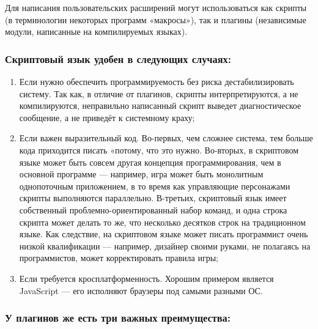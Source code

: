 

Для написания пользовательских расширений могут использоваться как скрипты (в терминологии некоторых программ «макросы»), так и плагины (независимые модули, написанные на компилируемых языках).

\subsubsection{Скриптовый язык удобен в следующих случаях:}

\begin{enumerate}
\item Если нужно обеспечить программируемость без риска дестабилизировать систему. Так как, в отличие от плагинов, скрипты интерпретируются, а не компилируются, неправильно написанный скрипт выведет диагностическое сообщение, а не приведёт к системному краху;
\item Если важен выразительный код. Во-первых, чем сложнее система, тем больше кода приходится писать «потому, что это нужно. Во-вторых, в скриптовом языке может быть совсем другая концепция программирования, чем в основной программе — например, игра может быть монолитным однопоточным приложением, в то время как управляющие персонажами скрипты выполняются параллельно. В-третьих, скриптовый язык имеет собственный проблемно-ориентированный набор команд, и одна строка скрипта может делать то же, что несколько десятков строк на традиционном языке. Как следствие, на скриптовом языке может писать программист очень низкой квалификации — например, дизайнер своими руками, не полагаясь на программистов, может корректировать правила игры;
\item Если требуется кросплатформенность. Хорошим примером является JavaScript — его исполняют браузеры под самыми разными ОС.
\end{enumerate}

\subsubsection{У плагинов же есть три важных преимущества:}

